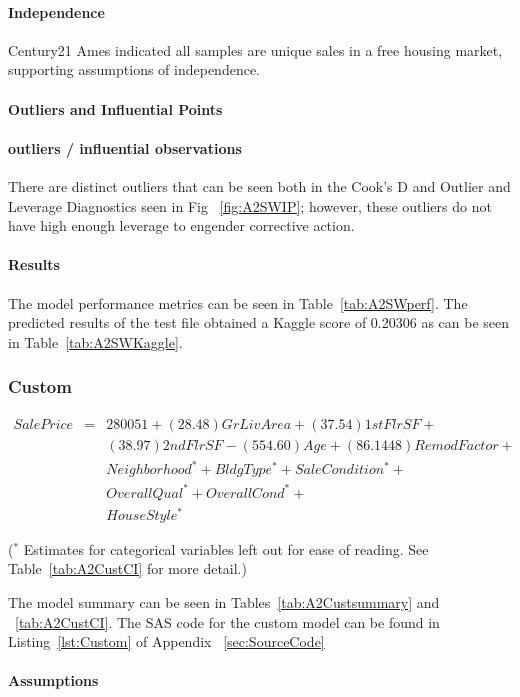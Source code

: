 \documentclass[11pt]{scrartcl} %
\begin{document}
\paragraph{Independence} Century21 Ames indicated all samples are unique sales in a free housing market, supporting assumptions of independence. 
\paragraph{Outliers and Influential Points}
\paragraph{outliers / influential observations} There are distinct outliers that can be seen both in the Cook's D and Outlier and Leverage Diagnostics seen in Fig ~\ref{fig:A2SWIP}; however, these outliers do not have high enough leverage to engender corrective action.
\paragraph{Results} The model performance metrics can be seen in Table~\ref{tab:A2SWperf}. The predicted results of the test file obtained a Kaggle score of 0.20306 as can be seen in Table~\ref{tab:A2SWKaggle}.
\subsubsection{Custom}
\begin{eqnarray*}
SalePrice &=& 280051 + (28.48)GrLivArea + (37.54)1stFlrSF + \\
& &                   (38.97)2ndFlrSF - (554.60)Age + (86.1448)RemodFactor +\\
& &	                Neighborhood^* + BldgType^* + SaleCondition ^*+\\
& &                   OverallQual^* + OverallCond^* + \\
& &                   HouseStyle^*
\end{eqnarray*}
\begin{center}
\small{ ($^*$ Estimates for categorical variables left out for ease of reading. See Table~\ref{tab:A2CustCI} for more detail.)}\\
\end{center}
The model summary can be seen in Tables~\ref{tab:A2Custsummary} and ~\ref{tab:A2CustCI}. The SAS code for the custom model can be found in Listing~\ref{lst:Custom} of Appendix ~\ref{sec:SourceCode}
\paragraph{Assumptions}
\end{document}
